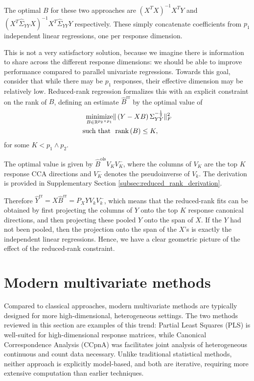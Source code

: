 \documentclass{article}
\begin{document}
The optimal $B$ for these two approaches are $\left(X^{T}X\right)^{-1}X^{T}Y$
and $\left(X^{T}\hat{\Sigma}_{YY} X\right)^{-1}X^{T}\hat{\Sigma}_{YY}Y$
respectively. These simply concatenate coefficients from $p_{1}$ independent
linear regressions, one per response dimension.

This is not a very satisfactory solution, because we imagine there is
information to share across the different response dimensions: we should be able
to improve performance compared to parallel univariate regressions. Towards this
goal, consider that while there may be $p_{1}$ responses, their effective
dimension may be relatively low. Reduced-rank regression formalizes this with an
explicit constraint on the rank of $B$, defining an estimate
$\hat{B}^{\text{rr}}$ by the optimal value of
\begin{align}
\mathop\mathrm{minimize}_{B \in \mathbb{R}^{p_{2} \times p_{1}}} &\|\left(Y - XB\right)\Sigma_{YY}^{-\frac{1}{2}}\|_{F}^{2} \label{eq:rr_obj}\\
\text{such that } &\text{ rank}\left(B\right) \leq K, \nonumber
\end{align}
for some $K < p_{1}\wedge p_{2}$.

The optimal value is given by $\hat{B}^{\text{ols}}V_{K}V_{K}^{-}$, where the
columns of $V_{K}$ are the top $K$ response CCA directions and $V_{K}^{-}$
denotes the pseudoinverse of $V_k$. The derivation is provided in Supplementary
Section \ref{subsec:reduced_rank_derivation}.

Therefore $\hat{Y}^{\text{rr}} = X\hat{B}^{\text{rr}} = P_{X}YV_{k}V_{k}^{-}$,
which means that the reduced-rank fits can be obtained by first projecting the
columns of $Y$ onto the top $K$ response canonical directions, and then
projecting these pooled $Y$ onto the span of $X$. If the $Y$ had not been
pooled, then the projection onto the span of the $X$'s is exactly the
independent linear regressions. Hence, we have a clear geometric picture of the
effect of the reduced-rank constraint.

\section{Modern multivariate methods}

Compared to classical approaches, modern multivariate methods are typically
designed for more high-dimensional, heterogeneous settings. The two methods
reviewed in this section are examples of this trend: Partial Least Squares (PLS)
is well-suited for high-dimensional response matrices, while Canonical
Correspondence Analysis (CCpnA) was facilitates joint analysis of heterogeneous
continuous and count data necessary. Unlike traditional statistical methods,
neither approach is explicitly model-based, and both are iterative, requiring
more extensive computation than earlier techniques.
\end{document}
